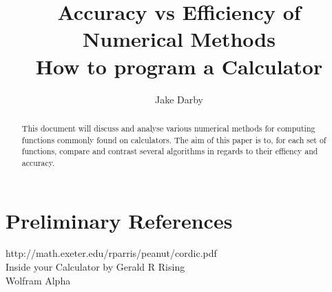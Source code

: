 \documentclass[12pt]{article}
\numberwithin{equation}{subsection}
\begin{document}
\author{Jake Darby}
\title{Accuracy vs Efficiency of Numerical Methods \\ \large How to program a Calculator}
\date{}
\maketitle

\begin{abstract}
\begin{center}
This document will discuss and analyse various numerical methods for computing functions commonly found on calculators. The aim of this paper is to, for each set of functions, compare and contrast several algorithms in regards to their effiency and accuracy.
\end{center}
\end{abstract}

\iffalse
\newpage
\tableofcontents
\newpage
\fi









\section{Preliminary References}
http://math.exeter.edu/rparris/peanut/cordic.pdf \\
Inside your Calculator by Gerald R Rising \\
Wolfram Alpha \\

\appendix
%
\end{document}
